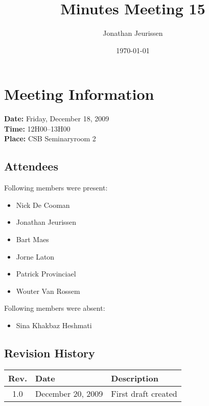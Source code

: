 \documentclass[a4paper, 12pt]{article}
\begin{document}
\title{Minutes Meeting 15}
\author{Jonathan Jeurissen}
\date{\today}

\maketitle	
	\section{Meeting Information}
		\textbf{Date:} Friday, December 18, 2009\\
		\textbf{Time:} 12H00--13H00\\
		\textbf{Place:} CSB Seminaryroom 2\\
		\subsection{Attendees}
Following members were present:
			\begin{itemize}
				\item Nick De Cooman
				\item Jonathan Jeurissen
				\item Bart Maes
				\item Jorne Laton
				\item Patrick Provinciael
				\item Wouter Van Rossem
			\end{itemize}
Following members were absent:
			\begin{itemize}
			 \item Sina Khakbaz Heshmati
			\end{itemize}
			
		\subsection{Revision History}
			\begin{tabular}{c | l | l }
				\textbf{Rev.} & \textbf{Date} & \textbf{Description} \\
				\hline
				1.0 & December 20, 2009 & First draft created \\
			\end{tabular}		
\end{document}
